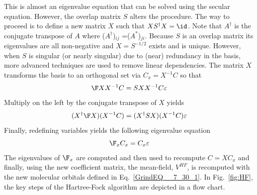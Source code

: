 \documentclass[11pt,oneside,final]{huthesis}%
\begin{document}
This is almost an eigenvalue equation that can be solved using the secular equation. However, the overlap matrix $S$ alters the procedure. The way to proceed is to define a new matrix $X$ such that $XS^{\dag } X=\id$. Note that $A^{\dag } $ is the conjugate transpose of $A$ where ($A^{\dag } $)\textit{${}_{ij}$} =($A^{*} $)${}_{ji}$.  Because $S$ is an overlap matrix its eigenvalues are all non-negative and  $X=S^{-1/2}$ exists and is unique.  However, when $S$ is singular (or nearly singular) due to (near) redundancy in the basis, more advanced techniques are used to remove linear dependencies. The matrix $X$ transforms the basis to an orthogonal set via $C_{x} =X^{-1} C$ so that 
\[
\F XX^{-1} C= SXX^{-1} C\varepsilon
\]
 Multiply on the left by the conjugate transpose of $X$ yields $$(X^{\dag } \F X)(X^{-1} C)=(X^{\dag } SX)(X^{-1} C)\varepsilon$$ Finally, redefining variables yields the following eigenvalue equation 
\begin{equation} \label{GrindEQ__7_35_} 
\F_{x} C_{x} =C_{x} \varepsilon  
\end{equation} 
The eigenvalues of $\F_x$ are computed and then used to recompute $C=XC_{x}$ and finally, using the new coefficient matrix, the mean-field, $V^{HF}$, is recomputed with the new molecular orbitals defined in Eq.~\eqref{GrindEQ__7_30_1}.  In Fig.~\ref{fig:HF}, the key steps of the Hartree-Fock algorithm are depicted in a flow chart.
\end{document}
